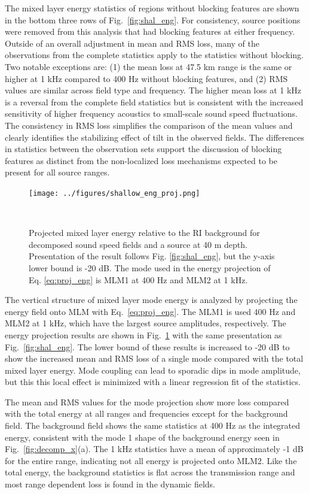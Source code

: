 \documentclass[preprint,NumberedRefs]{JASA}
\begin{document}
The mixed layer energy statistics of regions without blocking features are shown in the bottom three rows of Fig.~\ref{fig:shal_eng}. For consistency, source positions were removed from this analysis that had blocking features at either frequency. Outside of an overall adjustment in mean and RMS loss, many of the observations from the complete statistics apply to the statistics without blocking. Two notable exceptions are: (1) the mean loss at 47.5 km range is the same or higher at 1 kHz compared to 400 Hz without blocking features, and (2) RMS values are similar across field type and frequency. The higher mean loss at 1 kHz is a reversal from the complete field statistics but is consistent with the increased sensitivity of higher frequency acoustics to small-scale sound speed fluctuations. The consistency in RMS loss simplifies the comparison of the mean values and clearly identifies the stabilizing effect of tilt in the observed fields. The differences in statistics between the observation sets support the discussion of blocking features as distinct from the non-localized loss mechanisms expected to be present for all source ranges.

\begin{figure}
\texttt{[image: ../figures/shallow\_eng\_proj.png]}
    \caption{Projected mixed layer energy relative to the RI background for decomposed sound speed fields and a source at 40 m depth. Presentation of the result follows Fig. \ref{fig:shal_eng}, but the y-axis lower bound is -20 dB. The mode used in the energy projection of Eq. \eqref{eq:proj_eng} is MLM1 at 400 Hz and MLM2 at 1 kHz.}
    \label{fig:shal_proj}
\end{figure}
The vertical structure of mixed layer mode energy is analyzed by projecting the energy field onto MLM with Eq.~\eqref{eq:proj_eng}. The MLM1 is used 400 Hz and MLM2 at 1 kHz, which have the largest source amplitudes, respectively. The energy projection results are shown in Fig.~\ref{fig:shal_proj} with the same presentation as Fig.~\ref{fig:shal_eng}. The lower bound of these results is increased to -20 dB to show the increased mean and RMS loss of a single mode compared with the total mixed layer energy. Mode coupling can lead to sporadic dips in mode amplitude, but this this local effect is minimized with a linear regression fit of the statistics.

The mean and RMS values for the mode projection show more loss compared with the total energy at all ranges and frequencies except for the background field. The background field shows the same statistics at 400 Hz as the integrated energy, consistent with the mode 1 shape of the background energy seen in Fig.~\ref{fig:decomp_x}(a). The 1 kHz statistics have a mean of approximately -1 dB for the entire range, indicating not all energy is projected onto MLM2. Like the total energy, the background statistics is flat across the transmission range and most range dependent loss is found in the dynamic fields.
\end{document}
